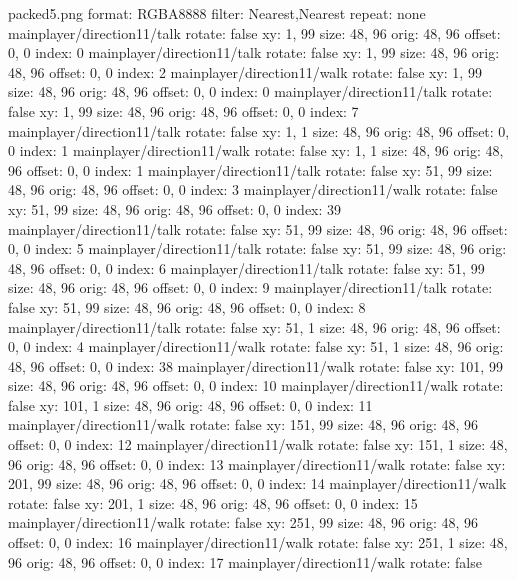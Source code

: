 packed5.png
format: RGBA8888
filter: Nearest,Nearest
repeat: none
mainplayer/direction11/talk
  rotate: false
  xy: 1, 99
  size: 48, 96
  orig: 48, 96
  offset: 0, 0
  index: 0
mainplayer/direction11/talk
  rotate: false
  xy: 1, 99
  size: 48, 96
  orig: 48, 96
  offset: 0, 0
  index: 2
mainplayer/direction11/walk
  rotate: false
  xy: 1, 99
  size: 48, 96
  orig: 48, 96
  offset: 0, 0
  index: 0
mainplayer/direction11/talk
  rotate: false
  xy: 1, 99
  size: 48, 96
  orig: 48, 96
  offset: 0, 0
  index: 7
mainplayer/direction11/talk
  rotate: false
  xy: 1, 1
  size: 48, 96
  orig: 48, 96
  offset: 0, 0
  index: 1
mainplayer/direction11/walk
  rotate: false
  xy: 1, 1
  size: 48, 96
  orig: 48, 96
  offset: 0, 0
  index: 1
mainplayer/direction11/talk
  rotate: false
  xy: 51, 99
  size: 48, 96
  orig: 48, 96
  offset: 0, 0
  index: 3
mainplayer/direction11/walk
  rotate: false
  xy: 51, 99
  size: 48, 96
  orig: 48, 96
  offset: 0, 0
  index: 39
mainplayer/direction11/talk
  rotate: false
  xy: 51, 99
  size: 48, 96
  orig: 48, 96
  offset: 0, 0
  index: 5
mainplayer/direction11/talk
  rotate: false
  xy: 51, 99
  size: 48, 96
  orig: 48, 96
  offset: 0, 0
  index: 6
mainplayer/direction11/talk
  rotate: false
  xy: 51, 99
  size: 48, 96
  orig: 48, 96
  offset: 0, 0
  index: 9
mainplayer/direction11/talk
  rotate: false
  xy: 51, 99
  size: 48, 96
  orig: 48, 96
  offset: 0, 0
  index: 8
mainplayer/direction11/talk
  rotate: false
  xy: 51, 1
  size: 48, 96
  orig: 48, 96
  offset: 0, 0
  index: 4
mainplayer/direction11/walk
  rotate: false
  xy: 51, 1
  size: 48, 96
  orig: 48, 96
  offset: 0, 0
  index: 38
mainplayer/direction11/walk
  rotate: false
  xy: 101, 99
  size: 48, 96
  orig: 48, 96
  offset: 0, 0
  index: 10
mainplayer/direction11/walk
  rotate: false
  xy: 101, 1
  size: 48, 96
  orig: 48, 96
  offset: 0, 0
  index: 11
mainplayer/direction11/walk
  rotate: false
  xy: 151, 99
  size: 48, 96
  orig: 48, 96
  offset: 0, 0
  index: 12
mainplayer/direction11/walk
  rotate: false
  xy: 151, 1
  size: 48, 96
  orig: 48, 96
  offset: 0, 0
  index: 13
mainplayer/direction11/walk
  rotate: false
  xy: 201, 99
  size: 48, 96
  orig: 48, 96
  offset: 0, 0
  index: 14
mainplayer/direction11/walk
  rotate: false
  xy: 201, 1
  size: 48, 96
  orig: 48, 96
  offset: 0, 0
  index: 15
mainplayer/direction11/walk
  rotate: false
  xy: 251, 99
  size: 48, 96
  orig: 48, 96
  offset: 0, 0
  index: 16
mainplayer/direction11/walk
  rotate: false
  xy: 251, 1
  size: 48, 96
  orig: 48, 96
  offset: 0, 0
  index: 17
mainplayer/direction11/walk
  rotate: false
